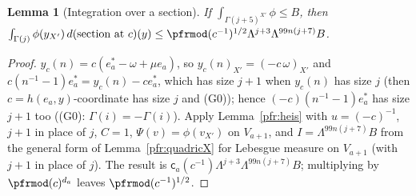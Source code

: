 \documentclass[10pt]{amsart}
\newtheorem{lemma}[theorem]{Lemma}
\theoremstyle{definition}
\theoremstyle{remark}
\begin{document}
\begin{lemma}[Integration over a section]\label{pfr:sectionint}
If $\int_{\Gamma(j+5)^{X'}}\phi\le B$, then $\int_{\Gamma(j)}\phi(y_{X'})\,d(\text{section at }c)(y)\le
\pfrmod(c^{-1})^{1/2}\Lambda^{j+3}\Lambda^{99n(j+7)}B$.
\end{lemma}
\begin{proof}
$y_c(n)=c(e_a^*-\omega+\mu e_a)$, so $y_c(n)_{X'}=(-c\,\omega)_{X'}$ and $c(n^{-1}-1)e_a^*=y_c(n)-ce_a^*$, which has size
$j+1$ when $y_c(n)$ has size $j$ (then $c=h(e_a,y)$-coordinate has size $j$ and (G0)); hence $(-c)(n^{-1}-1)e_a^*$ has size $j+1$ too ((G0): $\Gamma(i)=-\Gamma(i)$). Apply Lemma~\ref{pfr:heis} with
$u=(-c)^{-1}$, $j+1$ in place of $j$, $C=1$, $\Psi(v)=\phi(v_{X'})$ on $V_{a+1}$, and $I=\Lambda^{99n(j+7)}B$ from the
general form of Lemma~\ref{pfr:quadricX} for Lebesgue measure on $V_{a+1}$ (with $j+1$ in place of $j$). The result is
$\mathsf c_a(c^{-1})\Lambda^{j+3}\Lambda^{99n(j+7)}B$; multiplying by $\pfrmod(c)^{d_a}$ leaves $\pfrmod(c^{-1})^{1/2}$.
\end{proof}
\end{document}
